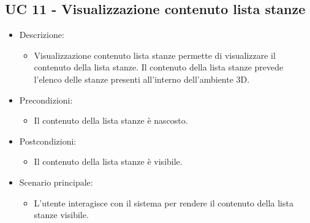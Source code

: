 \subsection{UC 11 - Visualizzazione contenuto lista stanze}
\begin{itemize}

	\item Descrizione:
	\begin{itemize}
		\item Visualizzazione contenuto lista stanze permette di visualizzare il contenuto della lista stanze.
\newline Il contenuto della lista stanze prevede l'elenco delle stanze presenti all'interno dell'ambiente 3D.
	\end{itemize}
	
	\item Precondizioni:
	\begin{itemize}
		\item Il contenuto della lista stanze è nascosto.
	\end{itemize}
	
	\item Postcondizioni:
	\begin{itemize}
		\item Il contenuto della lista stanze è visibile.
	\end{itemize}
	
	\item Scenario principale:
	\begin{itemize}
		\item L'utente interagisce con il sistema per rendere il contenuto della lista stanze visibile.
	\end{itemize}
	
\end{itemize}

